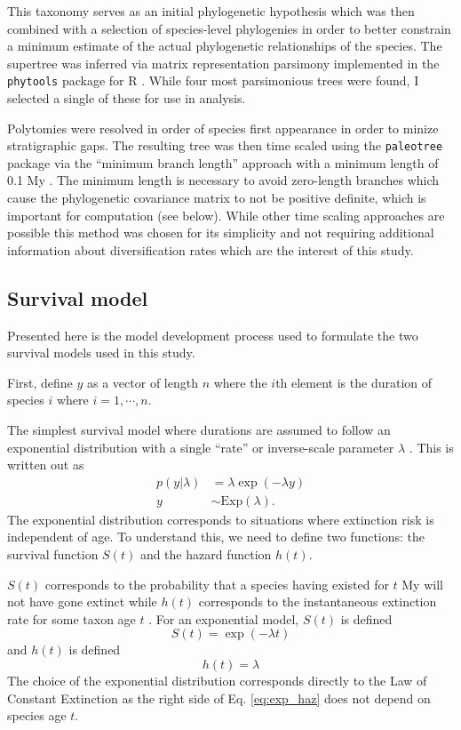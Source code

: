 \documentclass{article}
\begin{document}
This taxonomy serves as an initial phylogenetic hypothesis which was then combined with a selection of species-level phylogenies \cite{Bininda-Emonds2007,Raia2012f} in order to better constrain a minimum estimate of the actual phylogenetic relationships of the species. The supertree was inferred via matrix representation parsimony implemented in the \texttt{phytools} package for R \cite{revell2012phytools}. While four most parsimonious trees were found, I selected a single of these for use in analysis.

Polytomies were resolved in order of species first appearance in order to minize stratigraphic gaps. The resulting tree was then time scaled using the \texttt{paleotree} package via the ``minimum branch length'' approach with a minimum length of 0.1 My \cite{Bapst2012a}. The minimum length is necessary to avoid zero-length branches which cause the phylogenetic covariance matrix to not be positive definite, which is important for computation (see below). While other time scaling approaches are possible \cite{Bapst2013a,Hedman2010} this method was chosen for its simplicity and not requiring additional information about diversification rates which are the interest of this study. 


\subsection{Survival model}
Presented here is the model development process used to formulate the two survival models used in this study. 

First, define \(y\) as a vector of length \(n\) where the \(i\)th element is the duration of species \(i\) where \(i = 1,\cdots,n\).

The simplest survival model where durations are assumed to follow an exponential distribution with a single ``rate'' or inverse-scale parameter \(\lambda\) \cite{Klein2003}. This is written out as
\begin{align}
  p(y | \lambda) &= \lambda \exp(-\lambda y) \nonumber \\
  y &\sim \mathrm{Exp}(\lambda).
  \label{eq:exp}
\end{align}
The exponential distribution corresponds to situations where extinction risk is independent of age. To understand this, we need to define two functions: the survival function \(S(t)\) and the hazard function \(h(t)\). 

\(S(t)\) corresponds to the probability that a species having existed for \(t\) My will not have gone extinct while \(h(t)\) corresponds to the instantaneous extinction rate for some taxon age \(t\) \cite{Klein2003}. For an exponential model, \(S(t)\) is defined
\begin{equation}
  S(t) = \exp(-\lambda t)
  \label{eq:exp_surv}
\end{equation}
and \(h(t)\) is defined
\begin{equation}
  h(t) = \lambda
  \label{eq:exp_haz}
\end{equation}
The choice of the exponential distribution corresponds directly to the Law of Constant Extinction \cite{VanValen1973} as the right side of Eq. \ref{eq:exp_haz} does not depend on species age \(t\). 
\end{document}
